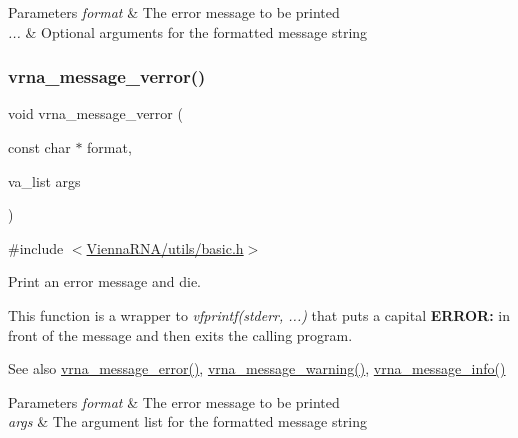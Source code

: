 \begin{DoxyParams}{Parameters}
{\em format} & The error message to be printed \\
\hline
{\em ...} & Optional arguments for the formatted message string \\
\hline
\end{DoxyParams}
\mbox{\label{group__message__utils_gabc1a08dea0d84b5c33701732172a8b18}} 
\subsubsection{\texorpdfstring{vrna\_message\_verror()}{vrna\_message\_verror()}}
{\footnotesize\ttfamily void vrna\+\_\+message\+\_\+verror (\begin{DoxyParamCaption}\item[{const char $\ast$}]{format,  }\item[{va\+\_\+list}]{args }\end{DoxyParamCaption})}



{\ttfamily \#include $<$\mbox{\hyperlink{utils_2basic_8h}{Vienna\+R\+N\+A/utils/basic.\+h}}$>$}



Print an error message and die. 

This function is a wrapper to {\itshape vfprintf(stderr, ...)} that puts a capital {\bfseries{E\+R\+R\+OR\+:}} in front of the message and then exits the calling program.

\begin{DoxySeeAlso}{See also}
\mbox{\hyperlink{group__message__utils_ga36b35be01d7f36cf7f59c245eee628d1}{vrna\+\_\+message\+\_\+error()}}, \mbox{\hyperlink{group__message__utils_ga6e07ed24add60693ba886d54d0a46635}{vrna\+\_\+message\+\_\+warning()}}, \mbox{\hyperlink{group__message__utils_ga039bae6153a6415b054dbe6045f83d03}{vrna\+\_\+message\+\_\+info()}}
\end{DoxySeeAlso}

\begin{DoxyParams}{Parameters}
{\em format} & The error message to be printed \\
\hline
{\em args} & The argument list for the formatted message string \\
\hline
\end{DoxyParams}
\mbox{\label{group__message__utils_ga6e07ed24add60693ba886d54d0a46635}} 
